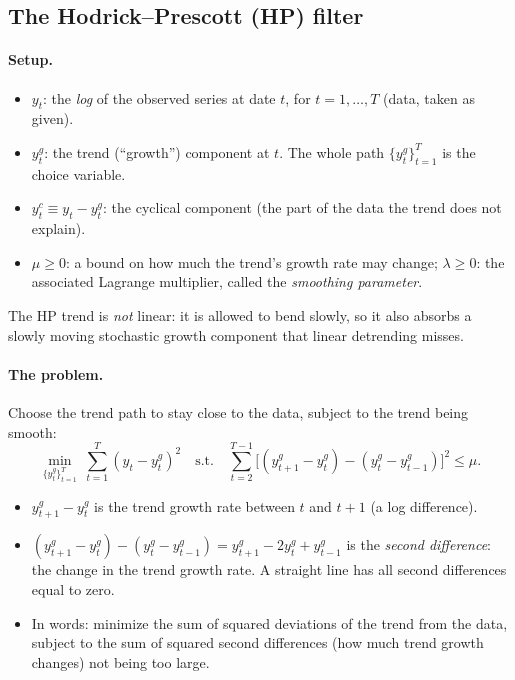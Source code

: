 \subsection{The Hodrick--Prescott (HP) filter }

\paragraph{Setup.}
\begin{itemize}
  \item $y_t$: the \emph{log} of the observed series at date $t$, for $t=1,\dots,T$ (data, taken as given).
  \item $y_t^g$: the trend (``growth'') component at $t$. The whole path $\{y_t^g\}_{t=1}^T$ is the choice variable.
  \item $y_t^c\equiv y_t-y_t^g$: the cyclical component (the part of the data the trend does not explain).
  \item $\mu\ge0$: a bound on how much the trend's growth rate may change; $\lambda\ge0$: the associated Lagrange multiplier, called the \emph{smoothing parameter}.
\end{itemize}
The HP trend is \emph{not} linear: it is allowed to bend slowly, so it also absorbs a slowly moving stochastic growth component that linear detrending misses.

\paragraph{The problem.} Choose the trend path to stay close to the data, subject to the trend being smooth:
\begin{equation}\label{eq:s6_hp}
\min_{\{y_t^g\}_{t=1}^T}\ \sum_{t=1}^T\left(y_t-y_t^g\right)^2
\quad\text{s.t.}\quad
\sum_{t=2}^{T-1}\Big[(y_{t+1}^g-y_t^g)-(y_t^g-y_{t-1}^g)\Big]^2\le\mu .
\end{equation}
\begin{itemize}
  \item $y_{t+1}^g-y_t^g$ is the trend growth rate between $t$ and $t+1$ (a log difference).
  \item $(y_{t+1}^g-y_t^g)-(y_t^g-y_{t-1}^g)=y_{t+1}^g-2y_t^g+y_{t-1}^g$ is the \emph{second difference}: the change in the trend growth rate. A straight line has all second differences equal to zero.
  \item In words: minimize the sum of squared deviations of the trend from the data, subject to the sum of squared second differences (how much trend growth changes) not being too large.
\end{itemize}

